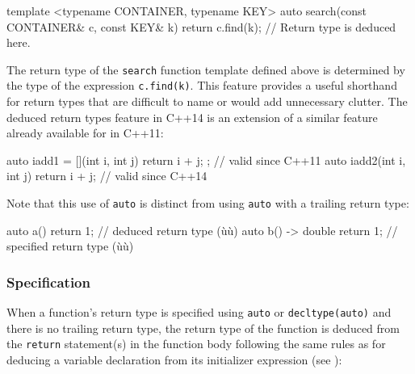 \begin{emcppslisting}[emcppsstandards={c++14}]
template <typename CONTAINER, typename KEY>
auto search(const CONTAINER& c, const KEY& k)
{
    return c.find(k);  // Return type is deduced here.
}
\end{emcppslisting}
    

\noindent The return type of the \lstinline!search! function template defined above
is determined by the type of the expression \lstinline!c.find(k)!. This
feature provides a useful shorthand for return types that are difficult
to name or would add unnecessary clutter. The deduced return types
feature in C++14 is an extension of a similar feature already available
for  in C++11:

\begin{emcppslisting}[emcppsstandards={c++14}]
auto iadd1 = [](int i, int j) { return i + j; };  // valid since C++11
auto iadd2(int i, int j)      { return i + j; }   // valid since C++14
\end{emcppslisting}
    

\noindent Note that this use of \lstinline!auto! is distinct from using \lstinline!auto!
with a trailing return type:

\begin{emcppslisting}[emcppsstandards={c++14}]
auto a()           { return 1; }  // deduced return type (ù{}ù)
auto b() -> double { return 1; }  // specified return type (ù{}ù)
\end{emcppslisting}
    

\subsubsection[Specification]{Specification}\label{specification}

When a function's return type is specified using \lstinline!auto! or
\lstinline!decltype(auto)! and there is no trailing return type, the return
type of the function is deduced from the \lstinline!return! statement(s) in
the function body following the same rules as for deducing a variable
declaration from its initializer expression (see ):

